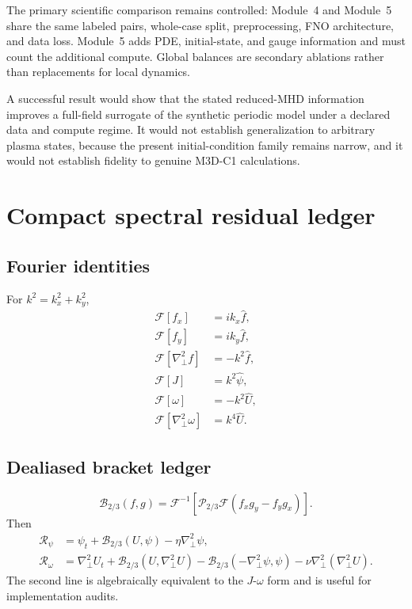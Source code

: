 \documentclass[11pt]{article}
\newcommand{\Lap}{\nabla_\perp^2}
\newcommand{\Rpsi}{\mathcal{R}_{\psi}}
\newcommand{\Romega}{\mathcal{R}_{\omega}}
\newcommand{\FFT}{\mathcal{F}}
\newcommand{\IFFT}{\mathcal{F}^{-1}}
\newcommand{\Ptwo}{\mathcal{P}_{2/3}}
\begin{document}
The primary scientific comparison remains controlled: Module~4 and Module~5 share the same labeled pairs, whole-case split, preprocessing, FNO architecture, and data loss. Module~5 adds PDE, initial-state, and gauge information and must count the additional compute. Global balances are secondary ablations rather than replacements for local dynamics.

A successful result would show that the stated reduced-MHD information improves a full-field surrogate of the synthetic periodic model under a declared data and compute regime. It would not establish generalization to arbitrary plasma states, because the present initial-condition family remains narrow, and it would not establish fidelity to genuine M3D-C1 calculations.

\appendix

\section{Compact spectral residual ledger}
\label{app:ledger}

\subsection{Fourier identities}
For $k^2=k_x^2+k_y^2$,
\begin{align}
\FFT[f_x]&=ik_x\widehat f,\\
\FFT[f_y]&=ik_y\widehat f,\\
\FFT[\Lap f]&=-k^2\widehat f,\\
\FFT[J]&=k^2\widehat\psi,\\
\FFT[\omega]&=-k^2\widehat U,\\
\FFT[\Lap\omega]&=k^4\widehat U.
\end{align}

\subsection{Dealiased bracket ledger}
\begin{equation}
\mathcal{B}_{2/3}(f,g)=
\IFFT\left[
\Ptwo\FFT(f_xg_y-f_yg_x)
\right].
\end{equation}
Then
\begin{align}
\Rpsi&=\psi_t+\mathcal{B}_{2/3}(U,\psi)-\eta\Lap\psi,\\
\Romega&=\Lap U_t+\mathcal{B}_{2/3}(U,\Lap U)
-\mathcal{B}_{2/3}(-\Lap\psi,\psi)-\nu\Lap(\Lap U).
\end{align}
The second line is algebraically equivalent to the $J$-$\omega$ form and is useful for implementation audits.
\end{document}
